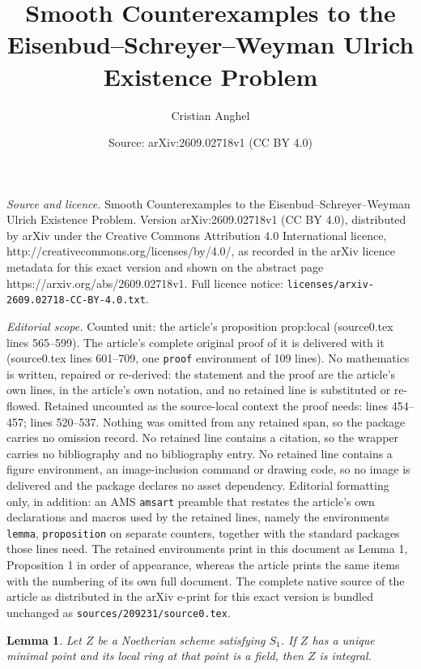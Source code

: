\documentclass[10pt,a4paper]{amsart}
\title{Smooth Counterexamples to the Eisenbud--Schreyer--Weyman Ulrich Existence Problem}
\author{Cristian Anghel}
\date{Source: arXiv:2609.02718v1 (CC BY 4.0)}
\newtheorem{lemma}{Lemma}
\begin{document}
\maketitle

\noindent\emph{Source and licence.} Smooth Counterexamples to the Eisenbud--Schreyer--Weyman Ulrich Existence Problem. Version arXiv:2609.02718v1 (CC BY 4.0), distributed by arXiv under the Creative Commons Attribution 4.0 International licence, http://creativecommons.org/licenses/by/4.0/, as recorded in the arXiv licence metadata for this exact version and shown on the abstract page https://arxiv.org/abs/2609.02718v1. Full licence notice: \texttt{licenses/arxiv-2609.02718-CC-BY-4.0.txt}.\par\smallskip

\noindent\textit{Editorial scope.} Counted unit: the article's proposition prop:local (source0.tex lines 565--599). The article's complete original proof of it is delivered with it (source0.tex lines 601--709, one \texttt{proof} environment of 109 lines). No mathematics is written, repaired or re-derived: the statement and the proof are the article's own lines, in the article's own notation, and no retained line is substituted or re-flowed.  Retained uncounted as the source-local context the proof needs: lines 454--457; lines 520--537.  Nothing was omitted from any retained span, so the package carries no omission record.  No retained line contains a citation, so the wrapper carries no bibliography and no bibliography entry.  No retained line contains a figure environment, an image-inclusion command or drawing code, so no image is delivered and the package declares no asset dependency.  Editorial formatting only, in addition: an AMS \texttt{amsart} preamble that restates the article's own declarations and macros used by the retained lines, namely the environments \texttt{lemma}, \texttt{proposition} on separate counters, together with the standard packages those lines need.  The retained environments print in this document as Lemma 1, Proposition 1 in order of appearance, whereas the article prints the same items with the numbering of its own full document.  The complete native source of the article as distributed in the arXiv e-print for this exact version is bundled unchanged as \texttt{sources/209231/source0.tex}.
\begin{lemma}\label{lem:s1-generic-field}
Let $Z$ be a Noetherian scheme satisfying $S_1$.  If $Z$ has a unique minimal
point and its local ring at that point is a field, then $Z$ is integral.
\end{lemma}
\end{document}
